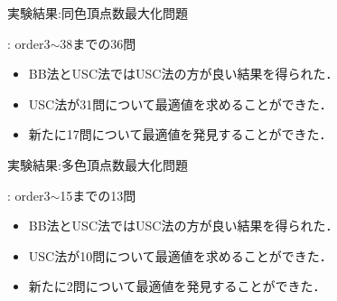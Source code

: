 \documentclass[dvipdfmx,11pt]{beamer}
\begin{document}

\begin{frame}{実験結果:同色頂点数最大化問題}

 \begin{block}{}
  : order3$\sim$38までの36問%
 \end{block}
 
 \begin{center}
  
 \end{center}

 \begin{itemize}
  \item BB法とUSC法ではUSC法の方が良い結果を得られた．
  \item USC法が31問について最適値を求めることができた．
  \item 新たに17問について最適値を発見することができた．
 \end{itemize}

\end{frame}


\begin{frame}{実験結果:多色頂点数最大化問題}

 \begin{block}{}
  : order3$\sim$15までの13問%
 \end{block}
 
 \begin{center}
  
 \end{center}

 \begin{itemize}
  \item BB法とUSC法ではUSC法の方が良い結果を得られた．%
  \item USC法が10問について最適値を求めることができた．
  \item 新たに2問について最適値を発見することができた．%
 \end{itemize}

\end{frame}

\end{document}
